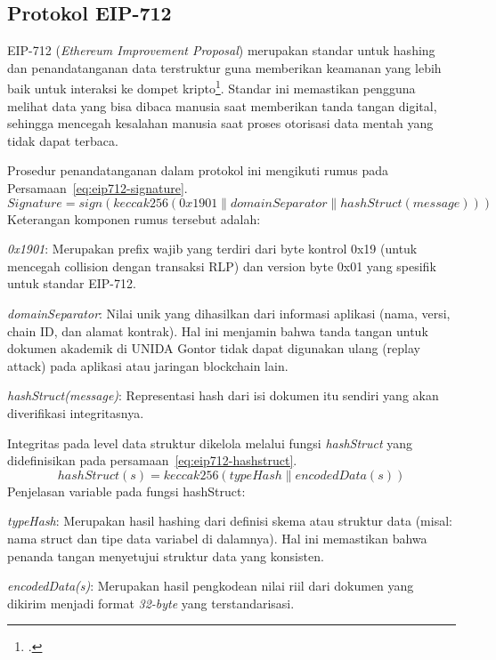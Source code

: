 		
		\subsection{Protokol EIP-712}
		EIP-712 (\textit{Ethereum Improvement Proposal}) merupakan standar untuk hashing dan penandatanganan data terstruktur guna memberikan keamanan yang lebih baik untuk interaksi ke dompet kripto\footcite{Bloemen2017}. Standar ini memastikan pengguna melihat data yang bisa dibaca manusia saat memberikan tanda tangan digital, sehingga mencegah kesalahan manusia saat proses otorisasi data mentah yang tidak dapat terbaca.

		Prosedur penandatanganan dalam protokol ini mengikuti rumus pada Persamaan~\eqref{eq:eip712-signature}.
		\begin{equation}
			Signature = sign(keccak256(0x1901 \parallel domainSeparator \parallel hashStruct(message)))
			\label{eq:eip712-signature}
		\end{equation}
		Keterangan komponen rumus tersebut adalah:

		\begin{subsecenumerate}
			\item \textit{0x1901}: Merupakan prefix wajib yang terdiri dari byte kontrol 0x19 (untuk mencegah collision dengan transaksi RLP) dan version byte 0x01 yang spesifik untuk standar EIP-712.
			\item \textit{domainSeparator}: Nilai unik yang dihasilkan dari informasi aplikasi (nama, versi, chain ID, dan alamat kontrak). Hal ini menjamin bahwa tanda tangan untuk dokumen akademik di UNIDA Gontor tidak dapat digunakan ulang (replay attack) pada aplikasi atau jaringan blockchain lain.
			\item \textit{hashStruct(message)}: Representasi hash dari isi dokumen itu sendiri yang akan diverifikasi integritasnya.
		\end{subsecenumerate}

		\newpage
		Integritas pada level data struktur dikelola melalui fungsi \textit{hashStruct} yang didefinisikan pada persamaan~\eqref{eq:eip712-hashstruct}.
		\begin{equation}
			hashStruct(s) = keccak256(typeHash \parallel encodedData(s))
			\label{eq:eip712-hashstruct}
		\end{equation}
		Penjelasan variable pada fungsi hashStruct:

		\begin{subsecenumerate}
			\item \textit{typeHash}: Merupakan hasil hashing dari definisi skema atau struktur data (misal: nama struct dan tipe data variabel di dalamnya). Hal ini memastikan bahwa penanda tangan menyetujui struktur data yang konsisten.
			\item \textit{encodedData(s)}: Merupakan hasil pengkodean nilai riil dari dokumen yang dikirim menjadi format \textit{32-byte} yang terstandarisasi.
		\end{subsecenumerate}

